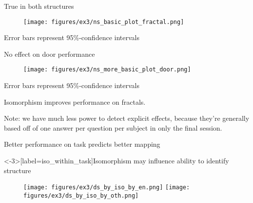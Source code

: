 \documentclass{beamer}
\begin{document}
\begin{frame}{True in both structures}
\begin{figure}
\centering
\texttt{[image: figures/ex3/ns\_basic\_plot\_fractal.png]}
\end{figure}
{\scriptsize Error bars represent 95\%-confidence intervals}
\end{frame}

\begin{frame}{No effect on door performance}
\begin{figure}
\centering
\texttt{[image: figures/ex3/ns\_more\_basic\_plot\_door.png]}
\end{figure}
{\scriptsize Error bars represent 95\%-confidence intervals}
\end{frame}

\begin{frame}[standout]
Isomorphism improves performance on fractals.
\end{frame}


\begin{frame}
Note: we have much less power to detect explicit effects, because they're generally based off of one answer per question per subject in only the final session.
\end{frame}

\begin{frame}{Better performance on task predicts better mapping}
\begin{figure}
\centering
{} 
\end{figure}
\end{frame}


\begin{frame}<-3>[label=iso_within_task]{Isomorphism may influence ability to identify structure}
\begin{figure}
\centering
{}   {
    \texttt{[image: figures/ex3/ds\_by\_iso\_by\_en.png]}
}  {
    \texttt{[image: figures/ex3/ds\_by\_iso\_by\_oth.png]}
}

\end{figure}
\end{frame}
\end{document}
